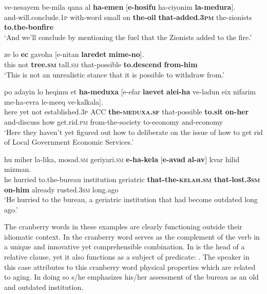 \documentclass[output=paper]{langsci/langscibook}
\begin{document}
    \ea\label{medura-rc}
        \gll ve-nesayem be-mila q{\tet}ana {\ayin}al \textbf{ha-{\shin}emen} [\textbf{{\shin}e-hosifu} ha-ciyonim \textbf{la-medura}].\\
            and-will.conclude.\textsc{1p} with-word small on \textbf{the-oil} \textbf{that-added.\textsc{3pm}} the-zionists \textbf{{to.the-bonfire}}\\
        \glt `And we'll conclude by mentioning the fuel that the Zionists added to the fire.'
    \z

    \ea\label{ec-rc}
        \gll ze lo \textbf{{\ayin}ec} gavoha [{\shin}e-nitan \textbf{laredet} \textbf{mime-no}].\\
            this not  \textbf{tree.\textsc{sm}} tall.\textsc{sm} that-possible \textbf{to.descend} \textbf{from-him}\\
        \glt `This is not an unrealistic stance that it is possible to withdraw from.'
    \z

    \ea\label{meduxa-rc}
        \gll po {\ayin}adayin lo heqimu {\alef}et \textbf{ha-meduxa} [{\shin}e-{\alef}ef{\shin}ar \textbf{la{\shin}evet} \textbf{{\ayin}alei-ha} ve-ladun {\alef}eix nif{\tet}arim me-ha-{\het}evra le-me{\shin}eq ve-kalkala].\\
            here yet not established.\textsc{3p} ACC \textbf{the-\textsc{meduxa}.\textsc{sf}} that-possible \textbf{to.sit} \textbf{on-her} and-discuss how get.rid.\textsc{pm} from-the-society to-economy and-economy\\
        \glt `Here they haven't yet figured out how to deliberate on the issue of how to get rid of Local Government Economic Services.'
    \z

    \ea\label{kelax-rc}
        \gll hu miher la-li{\shin}ka, mosad.\textsc{sm} geriya{\tet}ri.\textsc{sm} \textbf{{\shin}e-ha-kela{\het}} [\textbf{{\shin}e-{\alef}avad} \textbf{{\ayin}al-av}] kvar hi{\het}lid mizman.\\
            he hurried to.the-bureau institution geriatric \textbf{that-the-\textsc{kelah}.\textsc{sm}} \textbf{that-lost.\textsc{3sm}} \textbf{on-him} already rusted.\textsc{3sm} long.ago\\
        \glt `He hurried to the bureau, a geriatric institution that had become outdated long ago.'
    \z

The cranberry words in these examples are clearly functioning outside their idiomatic context. In  the cranberry word  serves as the complement of the verb  in a unique and innovative yet comprehensible combination. In   is the head of a relative clause, yet it also functions as a subject of predicate: . The speaker in this case attributes to this cranberry word physical properties which are related to aging. In doing so s/he emphasizes his/her assessment of the bureau as an old and outdated institution.
\end{document}
